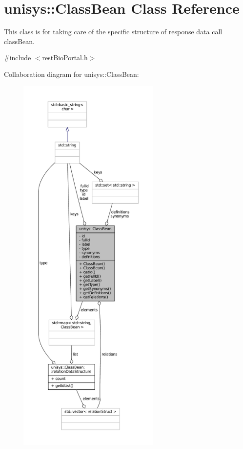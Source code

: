 \hypertarget{classunisys_1_1ClassBean}{\section{unisys\-:\-:Class\-Bean Class Reference}
\label{classunisys_1_1ClassBean}
}


This class is for taking care of the specific structure of response data call class\-Bean.  




{\ttfamily \#include $<$rest\-Bio\-Portal.\-h$>$}



Collaboration diagram for unisys\-:\-:Class\-Bean\-:
\nopagebreak
\begin{figure}[H]
\begin{center}
\leavevmode
\includegraphics[height=550pt]{classunisys_1_1ClassBean__coll__graph}
\end{center}
\end{figure}
